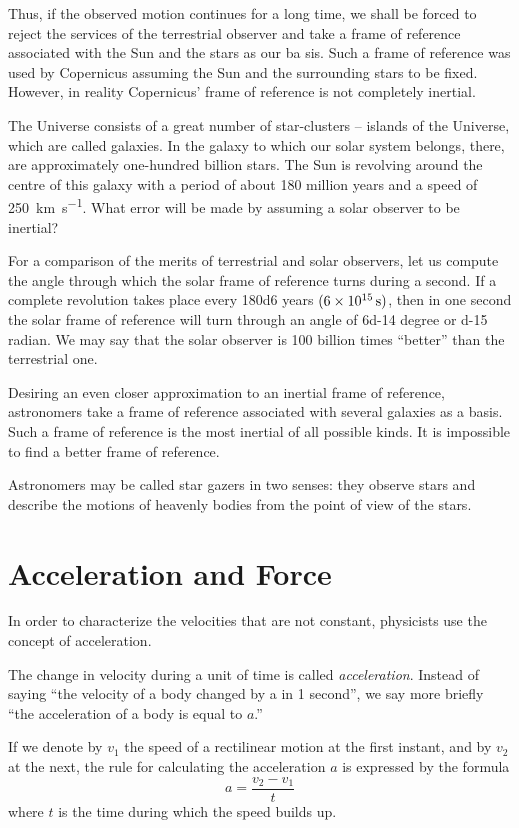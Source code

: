 Thus, if the observed motion continues for a long time, we shall be forced to reject the services of the terrestrial observer and take a frame of reference associated with the Sun and the stars as our ba sis. Such a frame of reference was used by Copernicus assuming the Sun and the surrounding stars to be fixed. However, in reality Copernicus' frame of reference is not completely inertial.

The Universe consists of a great number of star-clusters -- islands of the Universe, which are called galaxies. In the galaxy to which our solar system belongs, there, are approximately one-hundred billion stars. The Sun is revolving around the centre of this galaxy with a period of about 180 million years and a speed of \SI{250}{\kilo\meter\per\second}. What error will be made by assuming a solar observer to be inertial?

For a comparison of the merits of terrestrial and solar
observers, let us compute the angle through which the
solar frame of reference turns during a second. If a complete revolution takes place every \num{180d6} years
$(\SI{6d15}{\second})$, then in one second the solar frame of reference will turn through an angle of \num{6d-14} degree or \num{d-15} radian. We may say that the solar observer is 100 billion times ``better'' than the terrestrial one.

Desiring an even closer approximation to an inertial
frame of reference, astronomers take a frame of reference
associated with several galaxies as a basis. Such a frame
of reference is the most inertial of all possible kinds. It
is impossible to find a better frame of reference.

Astronomers may be called star gazers in two senses:
they observe stars and describe the motions of heavenly
bodies from the point of view of the stars.

\section{Acceleration and Force}

In order to characterize the velocities that are not constant, physicists use the concept of acceleration. 

The change in velocity during a unit of time is called \emph{acceleration}. Instead of saying ``the velocity of a body changed by a in 1 second'', we say more briefly ``the acceleration of a body is equal to $a$.''

If we denote by $v_{1}$ the speed of a rectilinear motion at
the first instant, and by $v_{2}$ at the next, the rule for calculating the acceleration $a$ is expressed by the formula
\begin{equation*}
a = \frac{v_{2} - v_{1}}{t}
\end{equation*}
where $t$ is the time during which the speed builds up.

